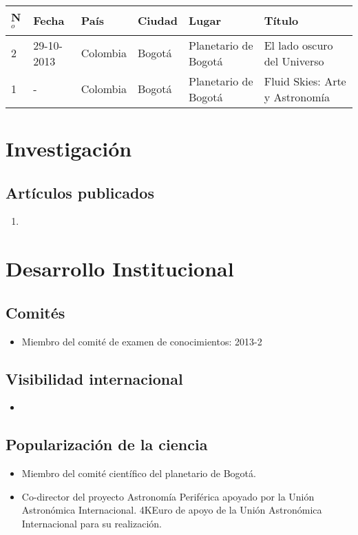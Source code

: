 \documentclass{article}
\begin{document}
\begin{tabular}{lp{2.0cm} p{1.2cm} p{1.5cm} p{2cm} p{5cm}}\hline
N$^{o}$ & Fecha & Pa\'is & Ciudad & Lugar & T\'itulo\\\hline
2 & 29-10-2013 & Colombia & Bogot\'a & Planetario de Bogot\'a & El lado oscuro del Universo\\ \hline
1 & -& Colombia & Bogot\'a & Planetario de Bogot\'a & Fluid Skies: Arte y Astronom\'ia\\ \hline
\end{tabular}

\section*{Investigaci\'on}

\subsection*{Art\'iculos publicados}

\begin{enumerate}
\item 
\end{enumerate}

\section*{Desarrollo Institucional}

\subsection*{Comit\'es}

\begin{itemize}
\item {Miembro del comit\'e de examen de conocimientos}: 2013-2
\end{itemize}

\subsection*{Visibilidad internacional}

\begin{itemize}
\item 
\end{itemize}

\subsection*{Popularizaci\'on de la ciencia}
\begin{itemize}
\item {Miembro del comit\'e cient\'ifico del planetario de Bogot\'a.}
\item {Co-director del proyecto Astronom\'ia Perif\'erica apoyado por
  la Uni\'on Astron\'omica Internacional. 4KEuro de apoyo de la Uni\'on Astron\'omica Internacional para su realizaci\'on.} 
\end{itemize}
\end{document}
